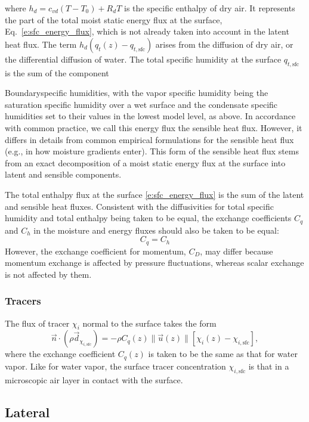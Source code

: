 \documentclass{article}
\begin{document}
where $h_d = c_{vd} (T - T_0) + R_d T$ is the specific enthalpy of dry air. It represents the part of the total moist static energy flux at the surface, Eq.~\eqref{e:sfc_energy_flux}, which is not already taken into account in the latent heat flux. The term $h_d (q_t(z) - q_{t, \mathrm{sfc}})$ arises from the diffusion of dry air, or the differential diffusion of water. The total specific humidity at the surface $q_{t, \mathrm{sfc}}$ is the sum of the component {Boundaryspecific humidities, with the vapor specific humidity being the saturation specific humidity over a wet surface and the condensate specific humidities set to their values in the lowest model level, as above. In accordance with common practice, we call this energy flux the sensible heat flux. However, it differs in details from common empirical formulations for the sensible heat flux (e.g., in how moisture gradients enter). This form of the sensible heat flux stems from an exact decomposition of a moist static energy flux at the surface into latent and sensible components. 

The total enthalpy flux at the surface \eqref{e:sfc_energy_flux} is the sum of the latent and sensible heat fluxes. Consistent with the diffusivities for total specific humidity and total enthalpy being taken to be equal, the exchange coefficients $C_q$ and $C_h$ in the moisture and energy fluxes should also be taken to be equal:
\[
C_q = C_h
\]
However, the exchange coefficient for momentum, $C_D$, may differ because momentum exchange is affected by pressure fluctuations, whereas scalar exchange is not affected by them.

\subsubsection{Tracers}

The flux of tracer $\chi_i$ normal to the surface takes the form 
\begin{equation}\label{e:sfc_tracer}
 \vec{n} \cdot (\rho \vec{d}_{\chi_{i, \mathrm{sfc}}}) = - \rho C_q(z) \| \vec{u}(z) \| \left[\chi_i(z) - \chi_{i, \mathrm{sfc}} \right],
\end{equation} 
where the exchange coefficient $C_q(z)$ is taken to be the same as that for water vapor. Like for water vapor, the surface tracer concentration $\chi_{i, \mathrm{sfc}}$ is that in a microscopic air layer in contact with the surface.

\subsection{Lateral}

}
\end{document}
